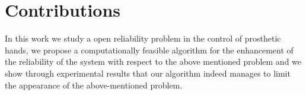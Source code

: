 \section{Contributions}\label{sec:contributions}
In this work we study a open reliability problem in the control of prosthetic hands, we propose a computationally feasible algorithm for the enhancement of the reliability of the system with respect to the above mentioned problem and we show through experimental results that our algorithm indeed manages to limit the appearance of the above-mentioned problem.